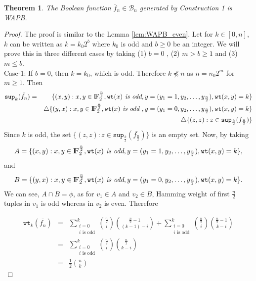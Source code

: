 \documentclass{article}[12pt]
\newtheorem{theorem}{Theorem}[section]
\newcommand{\FF}{{\rm I\!F}}
\newcommand{\CB}{\mathcal{B}}
\newcommand{\wt}{\mathtt{wt}}
\newcommand{\spt}{\mathtt{sup}}
\begin{document}
\begin{theorem}
	The Boolean function $\bar{f}_n \in \CB_n$ generated by Construction 1 is WAPB.
\end{theorem}
\begin{proof}
	The proof is similar to the Lemma \ref{lem:WAPB_even}. Let for $k \in [0,n],$ $k$ can be written as $k =k_0 2^b$ where $k_0$ is odd and $b \geq 0$ be an integer. We will prove this in three different cases by taking (1) $ b = 0$ , (2) $ m > b \geq 1$ and (3) $m \leq b$. \\
	Case-1: If $b=0$, then $k = k_0$, which is odd. Therefore $k \npreceq n$ as $n= n_0 2^m$ for $m \geq 1$. Then 
	\begin{eqnarray*}
		\spt_k(\bar{f_n}) & = &\{(x,y) : x,y \in \FF_2^{\frac{n}{2}}, \wt(x) \textit{ is odd}, y= (y_1= 1, y_2, \ldots, y_{\frac{n}{2}}), \wt(x,y) = k \} \\ 
	& &	\triangle \{ (y,x) : x,y \in \FF_2^{\frac{n}{2}}, \wt(x) \textit{ is odd }, y= (y_1=0,y_2,\ldots, y_{\frac{n}{2}}), \wt(x,y)=k \} \\
	& & \triangle \{(z,z) : z \in \spt_{\frac{k}{2}}(\bar{f_{\frac{n}{2}}})\}	
	\end{eqnarray*}	
 Since $k$ is odd, the set $ \{(z,z) : z \in \spt_{\frac{k}{2}}(\bar{f_{\frac{n}{2}}})\}	$ is an empty set. Now, by taking $$A = \{(x,y) : x,y \in \FF_2^{\frac{n}{2}}, \wt(x) \textit{ is odd}, y= (y_1=1,y_2,\ldots,y_\frac{n}{2}),\wt(x,y) = k \},$$ and $$ B =  \{(y,x) : x,y \in \FF_2^{\frac{n}{2}}, \wt(x) \textit{ is odd}, y= (y_1=0,y_2,\ldots,y_\frac{n}{2}), \wt(x,y) = k\}.$$ 
 We can see, $A \cap B = \phi$, as for $v_1 \in A$ and $v_2 \in B$, Hamming weight of first $\frac{n}{2}$ tuples in $v_1$ is odd whereas in $v_2$ is even. Therefore
 
 \begin{eqnarray*}
 	\wt_k(\bar{f_n})
 	&= & \sum_{\substack{i = 0 \\ i \text{ is odd}}}^{k} {\frac{n}{2} \choose i }{ \frac{n}{2}-1 \choose (k-1)-i} + \sum_{\substack{i = 0 \\ i \text{ is odd}}}^{k} {\frac{n}{2} \choose i }{{\frac{n}{2}-1} \choose k-i} \\
 	& = & \sum_{\substack{i = 0 \\ i \text{ is odd}}}^{k} {\frac{n}{2} \choose i } {\frac{n}{2} \choose k-i} \\
 	& = & \frac{1}{2} { n \choose k}
 \end{eqnarray*} 


\end{proof}
\end{document}
